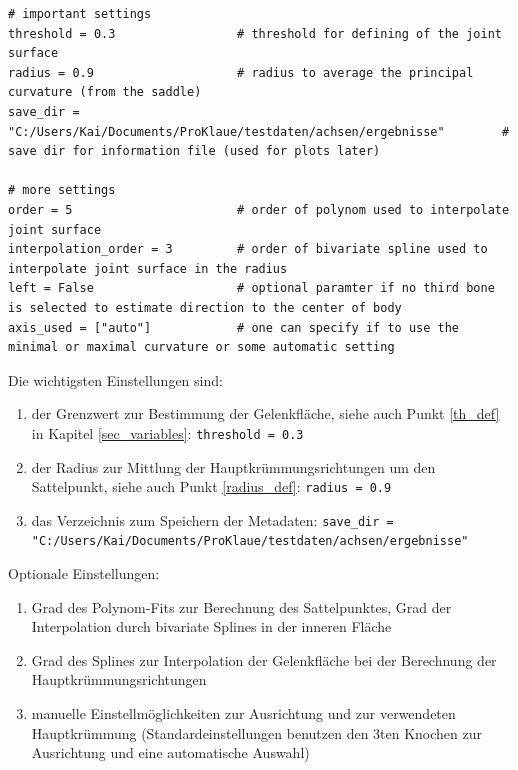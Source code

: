 \documentclass[a4paper, openany, oneside]{memoir}
\begin{document}
\begin{minipage}[c]{\textwidth}
\begin{lstlisting}
# important settings
threshold = 0.3                 # threshold for defining of the joint surface
radius = 0.9                    # radius to average the principal curvature (from the saddle)
save_dir = "C:/Users/Kai/Documents/ProKlaue/testdaten/achsen/ergebnisse"        # save dir for information file (used for plots later)

# more settings
order = 5                       # order of polynom used to interpolate joint surface
interpolation_order = 3         # order of bivariate spline used to interpolate joint surface in the radius
left = False                    # optional paramter if no third bone is selected to estimate direction to the center of body
axis_used = ["auto"]            # one can specify if to use the minimal or maximal curvature or some automatic setting
\end{lstlisting}
\end{minipage}

Die wichtigsten Einstellungen sind:
\begin{enumerate}
\item der Grenzwert zur Bestimmung der Gelenkfläche, siehe auch Punkt \ref{th_def} in Kapitel \ref{sec_variables}: \lstinline|threshold = 0.3| 
\item der Radius zur Mittlung der Hauptkrümmungsrichtungen um den Sattelpunkt, siehe auch Punkt \ref{radius_def}: \lstinline|radius = 0.9| 
\item das Verzeichnis zum Speichern der Metadaten: \lstinline|save_dir = "C:/Users/Kai/Documents/ProKlaue/testdaten/achsen/ergebnisse"| 
\end{enumerate}
Optionale Einstellungen:
\begin{enumerate}
\item Grad des Polynom-Fits zur Berechnung des Sattelpunktes, Grad der Interpolation durch bivariate Splines in der inneren Fläche  
\item Grad des Splines zur Interpolation der Gelenkfläche bei der Berechnung der Hauptkrümmungsrichtungen
\item manuelle Einstellmöglichkeiten zur Ausrichtung und zur verwendeten Hauptkrümmung (Standardeinstellungen benutzen den 3ten Knochen zur Ausrichtung und eine automatische Auswahl) 
\end{enumerate}
\end{document}
